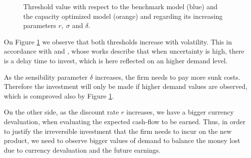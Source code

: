 \begin{figure}[!htb]
	\begin{subfigmatrix}{3}
	\end{subfigmatrix}
	\caption{Threshold value with respect to the benchmark model (blue) and the capacity optimized model (orange) and regarding its increasing parameters $r, \ \sigma$ and $\delta$.}
	\label{fig:sigm}
\end{figure}

On Figure \ref{fig:sigm} we observe that both thresholds increase with volatility. This in accordance with \cite{rita} and \cite{hagspiel:cap}, whose works describe that when uncertainty is high, there is a delay time to invest, which is here reflected on an higher demand level.

As the sensibility parameter $\delta$ increases, the firm needs to pay more sunk costs. Therefore the investment will only be made if higher demand values are observed, which is comproved also by Figure \ref{fig:sigm}.

On the other side, as the discount rate $r$ increases, we have a bigger currency devaluation, when evaluating the expected cash-flow to be earned. Thus, in order to justify the irreversible investment that the firm needs to incur on the new product, we need to observe bigger values of demand to balance the money lost due to currency devaluation and the future earnings.


